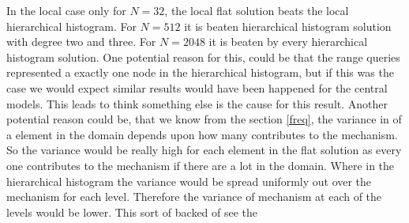 \documentclass[11pt]{article}
\theoremstyle{definition}
\begin{document}
In the local case only for $N=32$, the local flat solution beats the local hierarchical histogram. For $N=512$ it is beaten hierarchical histogram solution with degree two and three. For $N=2048$ it is beaten by every hierarchical histogram solution. One potential reason for this, could be that the range queries represented a exactly one node in the hierarchical histogram, but if this was the case we would expect similar results would have been happened for the central models. This leads to think something else is the cause for this result. Another potential reason could be, that we know from the section \ref{freq}, the variance in of a element in the domain depends upon how many contributes to the mechanism. So the variance would be really high for each element in the flat solution as every one contributes to the mechanism if there are a lot in the domain. Where in the hierarchical histogram the variance would be spread uniformly out over the mechanism for each level. Therefore the variance of mechanism at each of the levels would be lower. This sort of backed of see the 
\end{document}
